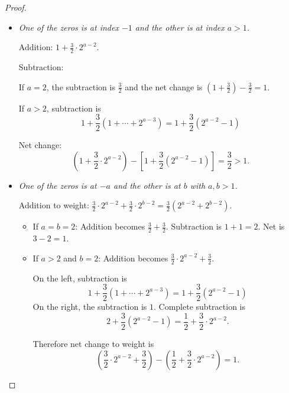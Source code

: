 \documentclass[12pt]{article}
\begin{document}
\begin{proof}
\begin{itemize}
    That is, the zeros are at index 1 and $a$ where $a>2$.

    Addition: $1 + \frac32\cdot 2^{a-2}$. 

    Subtraction:
    \[
    \frac32\left(1 + \cdots + 2^{a-3}\right) 
    =\frac32\left( 2^{a-2}-1 \right)
    \]

    Net change:
    \[
    \left(1 + \frac32\cdot 2^{a-2} \right) - \frac32\left( 2^{a-2}-1
    \right) = \frac52 > 1. 
    \]


  \item \emph{One of the zeros is at index $-1$ and the other is at
      index $a>1$.} 

    Addition: $1 + \frac32\cdot 2^{a-2}$. 

    Subtraction: 

    If $a=2$, the subtraction is $\frac32$ and the net change is
    $(1+\frac32)-\frac32=1$.  

    
    If $a>2$, subtraction is
    \[
    1 + \frac32\left(1 + \cdots + 2^{a-3}\right) = 1 + \frac32\left(
      2^{a-2}-1 \right)
    \]

    Net change:
    \[
    \left(1 + \frac32\cdot 2^{a-2} \right) - 
    \left[ 1 + \frac32\left(
      2^{a-2}-1 \right) \right] = \frac32 > 1. 
    \]

  \item \emph{One of the zeros is at $-a$ and the other is at $b$ with
      $a,b>1$.}

    Addition to weight: $\frac32\cdot2^{a-2} + \frac32\cdot2^{b-2} =
    \frac32\left(2^{a-2}+2^{b-2}\right)$. 

    \begin{itemize}
    \item If $a=b=2$: Addition becomes $\frac32 + \frac32$.
      Subtraction is $1+1=2$. Net is $3-2=1$.


    \item If $a>2$ and $b=2$: Addition becomes
      $\frac32\cdot2^{a-2}+\frac32$. 

      On the left, subtraction is 
      \[
      1 + \frac32\left(1+ \cdots + 2^{a-3}\right) = 
      1 +\frac32\left(2^{a-2}-1\right)
      \]
      On the right, the subtraction is $1$. Complete subtraction is
      \[
      2+\frac32\left(2^{a-2}-1\right) = \frac12 + \frac32\cdot2^{a-2}.
      \]
      
      Therefore net change to weight is 
      \[
      \left( \frac32\cdot2^{a-2}+\frac32 \right) - 
      \left( \frac12 + \frac32\cdot2^{a-2} \right) = 1.
      \]


\end{itemize}
\end{itemize}
\end{proof}
\end{document}
